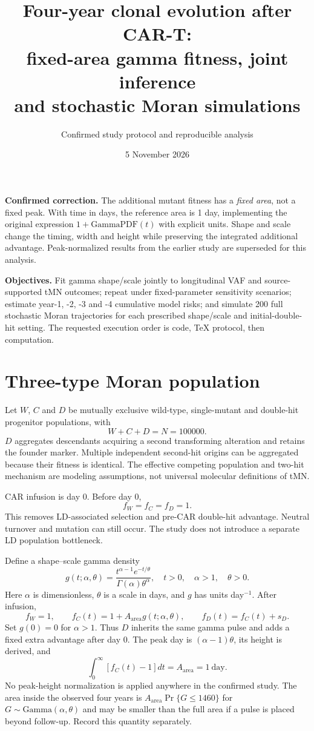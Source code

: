 \documentclass[11pt]{article}
\title{\color{navy}Four-year clonal evolution after CAR-T:\\fixed-area gamma fitness, joint inference\\and stochastic Moran simulations}
\author{Confirmed study protocol and reproducible analysis}\date{5 November 2026}
\begin{document}
\maketitle
\textbf{Confirmed correction.} The additional mutant fitness has a \emph{fixed area}, not a fixed peak. With time in days, the reference area is 1 day, implementing the original expression $1+\mathrm{GammaPDF}(t)$ with explicit units. Shape and scale change the timing, width and height while preserving the integrated additional advantage. Peak-normalized results from the earlier study are superseded for this analysis.

\textbf{Objectives.} Fit gamma shape/scale jointly to longitudinal VAF and source-supported tMN outcomes; repeat under fixed-parameter sensitivity scenarios; estimate year-1, -2, -3 and -4 cumulative model risks; and simulate 200 full stochastic Moran trajectories for each prescribed shape/scale and initial-double-hit setting. The requested execution order is code, TeX protocol, then computation.

\section{Three-type Moran population}
Let $W$, $C$ and $D$ be mutually exclusive wild-type, single-mutant and double-hit progenitor populations, with
\[
W+C+D=N=100000.
\]
$D$ aggregates descendants acquiring a second transforming alteration and retains the founder marker. Multiple independent second-hit origins can be aggregated because their fitness is identical. The effective competing population and two-hit mechanism are modeling assumptions, not universal molecular definitions of tMN.

CAR infusion is day 0. Before day 0,
\[
f_W=f_C=f_D=1.
\]
This removes LD-associated selection and pre-CAR double-hit advantage. Neutral turnover and mutation can still occur. The study does not introduce a separate LD population bottleneck.

Define a shape--scale gamma density
\[
g(t;\alpha,\theta)=\frac{t^{\alpha-1}e^{-t/\theta}}{\Gamma(\alpha)\theta^\alpha},
\quad t>0,\quad \alpha>1,\quad\theta>0.
\]
Here $\alpha$ is dimensionless, $\theta$ is a scale in days, and $g$ has units day$^{-1}$. After infusion,
\[
f_W=1,\qquad f_C(t)=1+A_{\mathrm{area}}g(t;\alpha,\theta),\qquad f_D(t)=f_C(t)+s_D.
\]
Set $g(0)=0$ for $\alpha>1$. Thus $D$ inherits the same gamma pulse and adds a fixed extra advantage after day 0. The peak day is $(\alpha-1)\theta$, its height is derived, and
\[
\int_0^\infty[f_C(t)-1]dt=A_{\mathrm{area}}=1\ \mathrm{day}.
\]
No peak-height normalization is applied anywhere in the confirmed study.
The area inside the observed four years is $A_{\mathrm{area}}\Pr\{G\le1460\}$ for $G\sim\mathrm{Gamma}(\alpha,\theta)$ and may be smaller than the full area if a pulse is placed beyond follow-up. Record this quantity separately.
\end{document}
